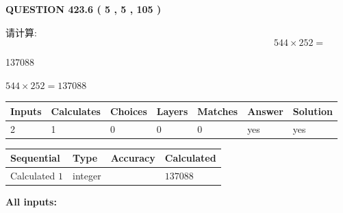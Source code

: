 \documentclass{ctexart}
\begin{document}
{\textbf{\Large{QUESTION
423.6 
 ( 5 , 5 , 105 )
}}}
  
  
 
请计算:
\begin{equation}
544  \times    %
252 = \nonumber
\end{equation}
 
 
 
\noindent{}
 
 

137088
 
 
\noindent{}
 
 

 
 
 
\noindent{}
 
 

$ %
544 \times  %
252=   %
137088$
 
 
\noindent{}
 
 

 
   
   
   
   
\noindent\begin{tabular}{|l|l|l|l|l|l|l|}
 \hline
Inputs & Calculates & Choices & Layers & Matches & Answer & Solution \\ \hline
 2  & 
 1  & 
 0
  & 
 0  & 
 0  & 
  yes & 
  yes 
  \\ \hline
 \end{tabular}
   
   
   
   
\noindent{}
   
   
  
  
\noindent\begin{tabular}{|l|l|l|l|}
\hline
 Sequential & Type & Accuracy & Calculated \\ 
\hline
 
 
  Calculated $  1 $ & integer &  & 
  $ 137088 $ 
 \\  \hline  
 \end{tabular}
   
   
   
   
\noindent\vspace{0.1in}\hspace{-0.08in} {\textbf{\Large{All inputs: }}}
   
\end{document}
